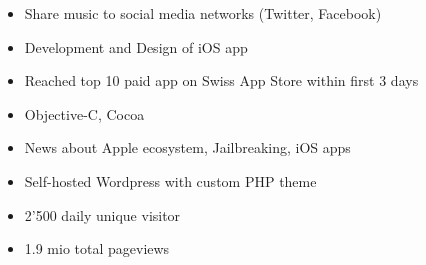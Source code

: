 \begin{itemize}
	\item Share music to social media networks (Twitter, Facebook)
	\item Development and Design of iOS app
	\item Reached top 10 paid app on Swiss App Store within first 3 days
	\item Objective-C, Cocoa
\end{itemize}

\divider

\begin{itemize}
	\item News about Apple ecosystem, Jailbreaking, iOS apps
	\item Self-hosted Wordpress with custom PHP theme
	\item 2'500 daily unique visitor
	\item 1.9 mio total pageviews
\end{itemize}